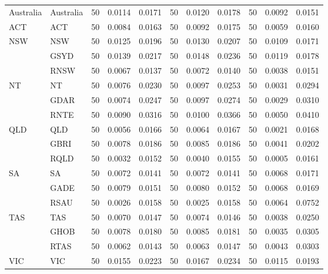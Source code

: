 \begin{table}[!hb]
{\begin{tabular}{llccccccccc}
    Australia & Australia & 50    & 0.0114 & 0.0171 & 50    & 0.0120 & 0.0178 & 50    & 0.0092 & 0.0151 \\
    ACT   & ACT   & 50    & 0.0084 & 0.0163 & 50    & 0.0092 & 0.0175 & 50    & 0.0059 & 0.0160 \\
    \multirow{3}[0]{*}{NSW} & NSW   & 50    & 0.0125 & 0.0196 & 50    & 0.0130 & 0.0207 & 50    & 0.0109 & 0.0171 \\
          & GSYD  & 50    & 0.0139 & 0.0217 & 50    & 0.0148 & 0.0236 & 50    & 0.0119 & 0.0178 \\
          & RNSW  & 50    & 0.0067 & 0.0137 & 50    & 0.0072 & 0.0140 & 50    & 0.0038 & 0.0151 \\
    \multirow{3}[0]{*}{NT} & NT    & 50    & 0.0076 & 0.0230 & 50    & 0.0097 & 0.0253 & 50    & 0.0031 & 0.0294 \\
          & GDAR  & 50    & 0.0074 & 0.0247 & 50    & 0.0097 & 0.0274 & 50    & 0.0029 & 0.0310 \\
          & RNTE  & 50    & 0.0090 & 0.0316 & 50    & 0.0100 & 0.0366 & 50    & 0.0050 & 0.0410 \\
    \multirow{3}[0]{*}{QLD} & QLD   & 50    & 0.0056 & 0.0166 & 50    & 0.0064 & 0.0167 & 50    & 0.0021 & 0.0168 \\
          & GBRI  & 50    & 0.0078 & 0.0186 & 50    & 0.0085 & 0.0186 & 50    & 0.0041 & 0.0202 \\
          & RQLD  & 50    & 0.0032 & 0.0152 & 50    & 0.0040 & 0.0155 & 50    & 0.0005 & 0.0161 \\
    \multirow{3}[0]{*}{SA} & SA    & 50    & 0.0072 & 0.0141 & 50    & 0.0072 & 0.0141 & 50    & 0.0068 & 0.0171 \\
          & GADE  & 50    & 0.0079 & 0.0151 & 50    & 0.0080 & 0.0152 & 50    & 0.0068 & 0.0169 \\
          & RSAU  & 50    & 0.0026 & 0.0158 & 50    & 0.0025 & 0.0158 & 50    & 0.0064 & 0.0752 \\
    \multirow{3}[0]{*}{TAS} & TAS   & 50    & 0.0070 & 0.0147 & 50    & 0.0074 & 0.0146 & 50    & 0.0038 & 0.0250 \\
          & GHOB  & 50    & 0.0078 & 0.0180 & 50    & 0.0085 & 0.0181 & 50    & 0.0035 & 0.0305 \\
          & RTAS  & 50    & 0.0062 & 0.0143 & 50    & 0.0063 & 0.0147 & 50    & 0.0043 & 0.0303 \\
    \multirow{3}[0]{*}{VIC} & VIC   & 50    & 0.0155 & 0.0223 & 50    & 0.0167 & 0.0234 & 50    & 0.0115 & 0.0193 \\

\end{tabular}}
\end{table}
